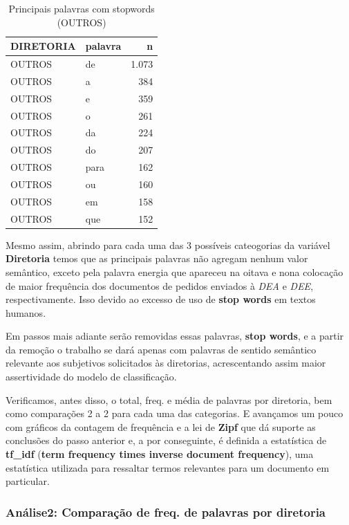 \documentclass[]{article}
\begin{document}
\begin{table}[!h]

\caption{\label{tab:unnamed-chunk-34}Principais palavras com stopwords (OUTROS)}
\centering
\begin{tabular}{llr}
\toprule
DIRETORIA & palavra & n\\
\midrule
\rowcolor{gray!6}  OUTROS & de & 1.073\\
OUTROS & a & 384\\
\rowcolor{gray!6}  OUTROS & e & 359\\
OUTROS & o & 261\\
\rowcolor{gray!6}  OUTROS & da & 224\\
\addlinespace
OUTROS & do & 207\\
\rowcolor{gray!6}  OUTROS & para & 162\\
OUTROS & ou & 160\\
\rowcolor{gray!6}  OUTROS & em & 158\\
OUTROS & que & 152\\
\bottomrule
\end{tabular}
\end{table}

Mesmo assim, abrindo para cada uma das 3 possíveis cateogorias da
variável \textbf{Diretoria} temos que as principais palavras não agregam
nenhum valor semântico, exceto pela palavra energia que apareceu na
oitava e nona colocação de maior frequência dos documentos de pedidos
enviados à \emph{DEA} e \emph{DEE}, respectivamente. Isso devido ao
excesso de uso de \textbf{stop words} em textos humanos.

Em passos mais adiante serão removidas essas palavras, \textbf{stop
words}, e a partir da remoção o trabalho se dará apenas com palavras de
sentido semântico relevante aos subjetivos solicitados às diretorias,
acrescentando assim maior assertividade do modelo de classificação.

Verificamos, antes disso, o total, freq. e média de palavras por
diretoria, bem como comparações 2 a 2 para cada uma das categorias. E
avançamos um pouco com gráficos da contagem de frequência e a lei de
\textbf{Zipf} que dá suporte as conclusões do passo anterior e, a por
conseguinte, é definida a estatística de \textbf{tf\_idf} (\textbf{term
frequency times inverse document frequency}), uma estatística utilizada
para ressaltar termos relevantes para um documento em particular.

\hypertarget{analise2-comparacao-de-freq.-de-palavras-por-diretoria}{%
\subsubsection{Análise2: Comparação de freq. de palavras por
diretoria}\label{analise2-comparacao-de-freq.-de-palavras-por-diretoria}}
\end{document}
